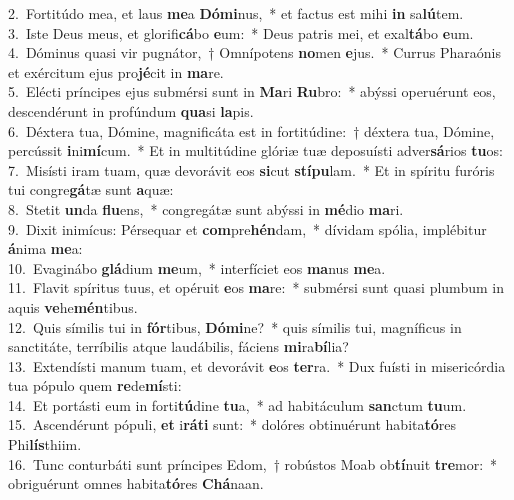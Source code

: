 {2.~}Fortitúdo mea, et laus \textbf{me}a \textbf{Dó}\textbf{mi}nus,~* et factus est mihi \textbf{in} sa\textbf{lú}tem.\\
{3.~}Iste Deus meus, et glorifi\textbf{cá}bo \textbf{e}um:~* Deus patris mei, et exal\textbf{tá}bo \textbf{e}um.\\
{4.~}Dóminus quasi vir pugnátor,~† Omnípotens \textbf{no}men \textbf{e}jus.~* Currus Pharaónis et exércitum ejus pro\textbf{jé}cit in \textbf{ma}re.\\
{5.~}Elécti príncipes ejus submérsi sunt in \textbf{Ma}ri \textbf{Ru}bro:~* abýssi operuérunt eos, descendérunt in profúndum \textbf{qua}si \textbf{la}pis.\\
{6.~}Déxtera tua, Dómine, magnificáta est in fortitúdine:~† déxtera tua, Dómine, percússit \textbf{i}ni\textbf{mí}cum.~* Et in multitúdine glóriæ tuæ deposuísti adver\textbf{sá}rios \textbf{tu}os:\\
{7.~}Misísti iram tuam, quæ devorávit eos \textbf{si}cut \textbf{stí}\textbf{pu}lam.~* Et in spíritu furóris tui congre\textbf{gá}tæ sunt \textbf{a}quæ:\\
{8.~}Stetit \textbf{un}da \textbf{flu}ens,~* congregátæ sunt abýssi in \textbf{mé}dio \textbf{ma}ri.\\
{9.~}Dixit inimícus: Pérsequar et \textbf{com}pre\textbf{hén}dam,~* dívidam spólia, implébitur \textbf{á}nima \textbf{me}a:\\
{10.~}Evaginábo \textbf{glá}dium \textbf{me}um,~* interfíciet eos \textbf{ma}nus \textbf{me}a.\\
{11.~}Flavit spíritus tuus, et opéruit \textbf{e}os \textbf{ma}re:~* submérsi sunt quasi plumbum in aquis \textbf{ve}he\textbf{mén}tibus.\\
{12.~}Quis símilis tui in \textbf{fór}tibus, \textbf{Dó}\textbf{mi}ne?~* quis símilis tui, magníficus in sanctitáte, terríbilis atque laudábilis, fáciens \textbf{mi}ra\textbf{bí}lia?\\
{13.~}Extendísti manum tuam, et devorávit \textbf{e}os \textbf{ter}ra.~* Dux fuísti in misericórdia tua pópulo quem \textbf{re}de\textbf{mí}sti:\\
{14.~}Et portásti eum in forti\textbf{tú}dine \textbf{tu}a,~* ad habitáculum \textbf{san}ctum \textbf{tu}um.\\
{15.~}Ascendérunt pópuli, \textbf{et} i\textbf{rá}\textbf{ti} sunt:~* dolóres obtinuérunt habita\textbf{tó}res Phi\textbf{lís}thiim.\\
{16.~}Tunc conturbáti sunt príncipes Edom,~† robústos Moab ob\textbf{tí}nuit \textbf{tre}mor:~* obriguérunt omnes habita\textbf{tó}res \textbf{Chá}naan.\\
